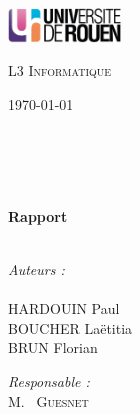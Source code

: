 
\begin{titlepage}

\begin{center}

\begin{minipage}[t]{0.48\textwidth}
  \begin{flushleft}
    \includegraphics [width=30mm]{images/logo-univ.jpg} \\[0.5cm]
    \begin{spacing}{1.5}
      \textsc{L3 Informatique}
    \end{spacing}
  \end{flushleft}
\end{minipage}
\begin{minipage}[t]{0.48\textwidth}
  \begin{flushright}
    \today
  \end{flushright}
\end{minipage} \\[1.5cm]

\textsc{\Large \reportsubject}\\[0.8cm]
\HRule \\[0.4cm]
{\huge \bfseries \reporttitle \\ Rapport}\\[0.8cm]
\HRule \\[1.5cm]

\parskip=200pt

\begin{minipage}[t]{0.3\textwidth}
  \begin{flushleft} \large
    \emph{Auteurs :}\\
    \reportauthor \\ 
    HARDOUIN Paul \\ 
    BOUCHER Laëtitia \\ 
    BRUN Florian
  \end{flushleft}
\end{minipage}
\begin{minipage}[t]{0.6\textwidth}
  \begin{flushright} \large
    \emph{Responsable :} \\
    M.~ \textsc{Guesnet} \\
  \end{flushright}
\end{minipage}

\vfill

\end{center}

\end{titlepage}
